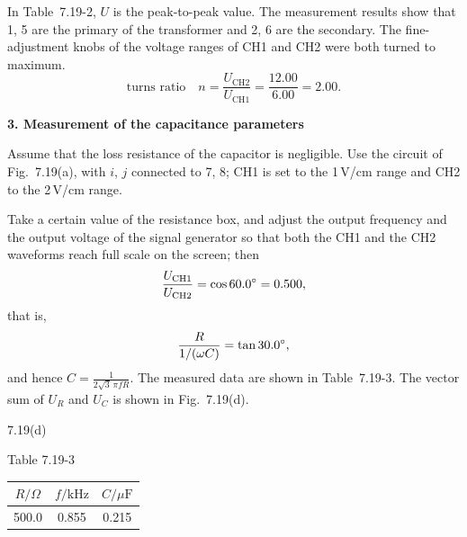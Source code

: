 In Table~7.19-2, $U$ is the peak-to-peak value. The measurement results show that 1, 5 are the primary of the transformer and 2, 6 are the secondary. The fine-adjustment knobs of the voltage ranges of CH1 and CH2 were both turned to maximum.
\[
\text{turns ratio}\quad n=\dfrac{U_{\mathrm{CH2}}}{U_{\mathrm{CH1}}}=\dfrac{12.00}{6.00}=2.00 .
\]

\textbf{3. Measurement of the capacitance parameters}

Assume that the loss resistance of the capacitor is negligible. Use the circuit of Fig.~7.19(a), with $i$, $j$ connected to 7, 8; CH1 is set to the 1\,V/cm range and CH2 to the 2\,V/cm range.

Take a certain value of the resistance box, and adjust the output frequency and the output voltage of the signal generator so that both the CH1 and the CH2 waveforms reach full scale on the screen; then
\[
\dfrac{U_{\mathrm{CH1}}}{U_{\mathrm{CH2}}}=\cos 60.0^{\circ}=0.500,
\]
that is,
\[
\dfrac{R}{1/(\omega C)}=\tan 30.0^{\circ},
\]
and hence $C=\frac{1}{2\sqrt{3}\,\pi f R}$. The measured data are shown in Table~7.19-3. The vector sum of $U_R$ and $U_C$ is shown in Fig.~7.19(d).

\begin{figbox}{7.19(d)}
\end{figbox}

\begin{center}
{\small Table 7.19-3}\\[2pt]
\begin{tabular}{ccc}
\toprule
$R/\Omega$ & $f/\mathrm{kHz}$ & $C/\mu\mathrm{F}$\\
\midrule
500.0 & 0.855 & 0.215\\
\bottomrule
\end{tabular}
\end{center}

